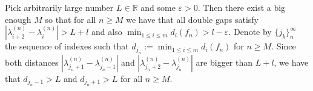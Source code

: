 \documentclass[11pt]{article}
\begin{document}
Pick arbitrarily large number $L\in\mathbb{R}$ and some $\varepsilon > 0$. Then there exist a big enough $M$ so that for all $n\geq M$ we have that all double gaps satisfy $|\lambda^{(n)}_{i+2} - \lambda^{(n)}_i| > L + l$ and also $\min_{1\leq i \leq m} d_i (f_n)> l - \varepsilon$. Denote by $\{j_k\}_{n}^{\infty}$ the sequence of indexes such that $d_{j_n}:=\min_{1\leq i \leq m} d_i (f_n)$ for $n\geq M$. Since both distances $|\lambda^{(n)}_{j_n+1} - \lambda^{(n)}_{j_n-1}|$ and $|\lambda^{(n)}_{j_n+2} - \lambda^{(n)}_{j_n}|$ are bigger than $L + l$, we have that $d_{j_n-1}> L$ and $d_{j_n+1} > L$ for all $n\geq M$.
\end{document}
